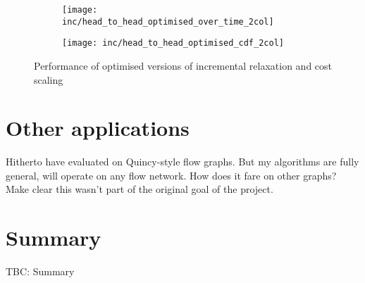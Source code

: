 \begin{figure}
    \begin{widepage}
    \begin{subfigure}[c]{0.5\textwidth}
        \texttt{[image: inc/head\_to\_head\_optimised\_over\_time\_2col]}
    \end{subfigure}
    \begin{subfigure}[c]{0.5\textwidth}
        \texttt{[image: inc/head\_to\_head\_optimised\_cdf\_2col]}
    \end{subfigure}
    \end{widepage}
    \caption{Performance of optimised versions of incremental relaxation and cost scaling}
    \label{fig:inc-head-to-head-optimised}
\end{figure}

\section{Other applications}

Hitherto have evaluated on Quincy-style flow graphs. But my algorithms are fully general, will operate on any flow network. How does it fare on other graphs? Make clear this wasn't part of the original goal of the project.

\section{Summary}

TBC: Summary